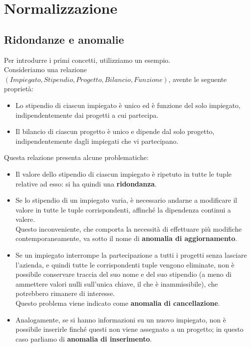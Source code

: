 \chapter{Normalizzazione}

\section{Ridondanze e anomalie}
Per introdurre i primi concetti, utilizziamo un esempio.\\
Consideriamo una relazione $(Impiegato, Stipendio, Progetto, Bilancio, Funzione)$, avente le seguente proprietà:
    \begin{itemize}
        \item{Lo stipendio di ciascun impiegato è unico ed è funzione del solo impiegato, indipendentemente dai progetti a cui partecipa.}
        \item{Il bilancio di ciascun progetto è unico e dipende dal solo progetto, indipendentemente dagli impiegati che vi partecipano.}
    \end{itemize}
Questa relazione presenta alcune problematiche:
    \begin{itemize}
        \item{Il valore dello stipendio di ciascun impiegato è ripetuto in tutte le tuple relative ad esso: si ha quindi una \textbf{ridondanza}.}
        \item{Se lo stipendio di un impiegato varia, è necessario andarne a modificare il valore in tutte le tuple corrispondenti, affinché la dipendenza continui a valere.\\
        Questo inconveniente, che comporta la necessità di effettuare più modifiche contemporaneamente, va sotto il nome di \textbf{anomalia di aggiornamento}.}
        \item{Se un impiegato interrompe la partecipazione a tutti i progetti senza lasciare l'azienda, e quindi tutte le corrispondenti tuple vengono eliminate, non è possibile conservare traccia del suo nome e del suo stipendio (a meno di ammettere valori nulli sull'unica chiave, il che è inammissibile), che potrebbero rimanere di interesse.\\
        Questo problema viene indicato come \textbf{anomalia di cancellazione}.}
        \item{Analogamente, se si hanno informazioni su un nuovo impiegato, non è possibile inserirle finché questi non viene assegnato a un progetto; in questo caso parliamo di \textbf{anomalia di inserimento}.}
    \end{itemize}
